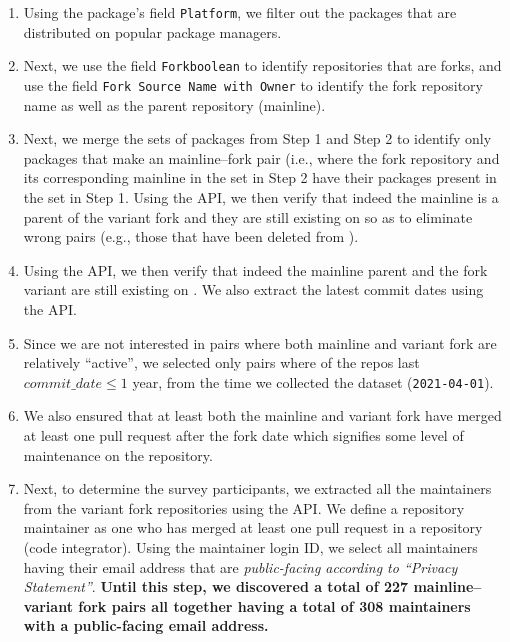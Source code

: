 \begin{enumerate}[label=\alph*.]
\item  Using the package's field \texttt{Platform}, we filter out the packages that are distributed on popular package managers.

\item Next, we use the field \texttt{Forkboolean} to identify repositories that are forks, and use the field \texttt{Fork Source Name with Owner} to identify the fork repository name as well as the parent repository (mainline).

\item Next, we merge the sets of packages from Step 1 and Step 2 to identify only packages that make an mainline--fork pair (i.e., where the fork repository and its corresponding mainline in the set in Step 2 have their packages present in the set in Step 1. Using the \gh API, we then verify that indeed the mainline is a parent of the variant fork and they are still existing on \gh so as to eliminate wrong pairs (e.g., those that have been deleted from \gh). 

\item Using the \gh API, we then verify that indeed the mainline parent and the fork variant are still existing on \gh. We also extract the latest commit dates using the \gh API.

\item \label{sec:active} Since we are not interested in pairs where both mainline and variant fork are relatively ``active'', we selected only pairs where of the repos last $commit\_date \leq 1$ year, from the time we collected the dataset (\texttt{2021-04-01}). 

\item \label{sec:pr} We also ensured that at least both the mainline and variant fork have merged at least one pull request after the fork date which signifies some level of maintenance on the repository.  %

\item \label{sec:email} Next, to determine the survey participants, we extracted all the maintainers from the variant fork repositories using the \gh API. We define a repository maintainer as one who has merged at least one pull request in a repository (code integrator). Using the maintainer login ID, we select all maintainers having their email address that are \textit{public-facing according to ``\gh Privacy Statement''}. \textbf{Until this step, we discovered a total of 227 mainline--variant fork pairs all together having a total of 308 maintainers with a public-facing email address.}

\end{enumerate}

